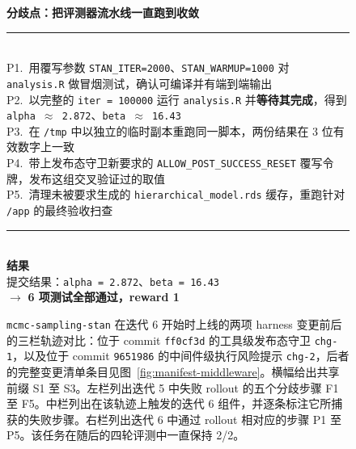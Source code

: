 \begin{figure}[t]
\begin{tcbraster}
        \begin{tcolorbox}[colback=aheTeal!12,colframe=aheBlue,colbacktitle=aheBlue,
                          title={\scriptsize\textbf{迭代 6 变更之后，相同种子，迭代 6，reward 1.0}}]
            \textbf{\textcolor{aheBlue}{分歧点：把评测器流水线一直跑到收敛}} \\
            \rule{\linewidth}{0.3pt}\\[1pt]
            P1.~用覆写参数 \texttt{STAN\_ITER=2000}、\texttt{STAN\_WARMUP=1000} 对 \texttt{analysis.R} 做冒烟测试，确认可编译并有端到端输出 \\[2pt]
            P2.~以完整的 \texttt{iter = 100000} 运行 \texttt{analysis.R} 并\textbf{等待其完成}，得到 \texttt{alpha $\approx$ 2.872}、\texttt{beta $\approx$ 16.43} \\[2pt]
            P3.~在 \texttt{/tmp} 中以独立的临时副本重跑同一脚本，两份结果在 3 位有效数字上一致 \\[2pt]
            P4.~带上发布态守卫新要求的 \texttt{ALLOW\_POST\_SUCCESS\_RESET} 覆写令牌，发布这组交叉验证过的取值 \\[2pt]
            P5.~清理未被要求生成的 \texttt{hierarchical\_model.rds} 缓存，重跑针对 \texttt{/app} 的最终验收扫查 \\[3pt]
            \rule{\linewidth}{0.3pt}\\
            \textbf{\textcolor{aheBlue}{结果}} \\
            提交结果：\texttt{alpha = 2.872}、\texttt{beta = 16.43} \\
            $\rightarrow$ \textbf{6 项测试全部通过，reward 1}
        \end{tcolorbox}
    \end{tcbraster}
    \caption{\texttt{mcmc-sampling-stan} 在迭代 6 开始时上线的两项 harness 变更前后的三栏轨迹对比：位于 commit \texttt{ff0cf3d} 的工具级发布态守卫 \texttt{chg-1}，以及位于 commit \texttt{9651986} 的中间件级执行风险提示 \texttt{chg-2}，后者的完整变更清单条目见图~\ref{fig:manifest-middleware}。横幅给出共享前缀 S1 至 S3。左栏列出迭代 5 中失败 rollout 的五个分歧步骤 F1 至 F5。中栏列出在该轨迹上触发的迭代 6 组件，并逐条标注它所捕获的失败步骤。右栏列出迭代 6 中通过 rollout 相对应的步骤 P1 至 P5。该任务在随后的四轮评测中一直保持 2/2。}
    \label{fig:case-trajectory-mcmc}
\end{figure}
